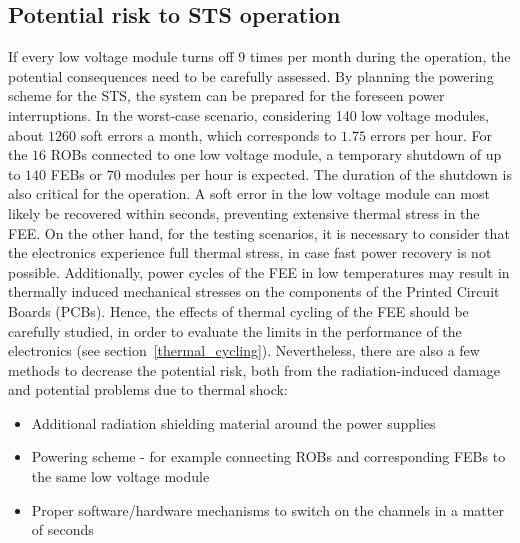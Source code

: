 \subsection{Potential risk to STS operation}
If every low voltage module turns off $9$ times per month during the operation, the potential consequences need to be carefully assessed. By planning the powering scheme for the \gls{STS}, the system can be prepared for the foreseen power interruptions. In the worst-case scenario, considering 140 low voltage modules,  about $1260$ soft errors a month, which corresponds to $1.75$ errors per hour.  For the $16$ \glspl{ROB} connected to one low voltage module, a temporary shutdown of up to $140$ \glspl{FEB} or $70$ modules per hour is expected.  The duration of the shutdown is also critical for the operation. A soft error in the low voltage module can most likely be recovered within seconds, preventing extensive thermal stress in the \gls{FEE}. On the other hand, for the testing scenarios, it is necessary to consider that the electronics experience full thermal stress, in case fast power recovery is not possible. Additionally, power cycles of the \gls{FEE} in low temperatures may result in thermally induced mechanical stresses on the components of the Printed Circuit Boards (\glspl{PCB}). Hence, the effects of thermal cycling of the \gls{FEE} should be carefully studied, in order to evaluate the limits in the performance of the electronics  (see section~\ref{thermal_cycling}). Nevertheless, there are also a few methods to decrease the potential risk, both from the radiation-induced damage and potential problems due to thermal shock:
\begin{itemize}
    \item Additional radiation shielding material around the power supplies
    \item Powering scheme - for example connecting \glspl{ROB} and corresponding \glspl{FEB} to the same low voltage module
    \item Proper software/hardware mechanisms to switch on the channels in a matter of seconds
\end{itemize}
\newpage
